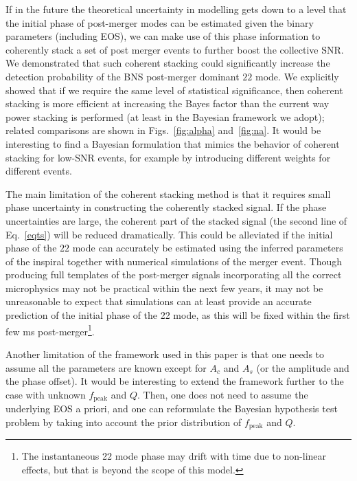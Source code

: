 \documentclass[prd,aps,floatfix,superscriptaddress,nofootinbib,twocolumn,10pt,English]{revtex4-1}
\begin{document}
If in the future the theoretical uncertainty in modelling gets down 
to a level that the initial phase of post-merger modes can be estimated
given the binary parameters (including EOS), we can make
use of this phase information to
coherently stack a set of post merger events to further boost the collective
SNR. We demonstrated that such coherent stacking could significantly
increase the detection probability of the BNS post-merger dominant
$22$ mode. 
We explicitly
showed that if we require the same level of statistical significance,
then coherent stacking is more efficient at increasing the Bayes
factor than the current way power stacking is performed (at least in
the Bayesian framework we adopt); related comparisons are shown in
Figs.~\ref{fig:alpha} and~\ref{fig:na}. It would be interesting to
find a Bayesian formulation that mimics the behavior of coherent
stacking for low-SNR events, for example by introducing different
weights for different events.


The main limitation of the coherent stacking method is that it
requires small phase uncertainty in constructing the coherently
stacked signal. If the phase uncertainties are large, the coherent part 
of the stacked signal (the second line of Eq.~\eqref{eqts}) will be reduced dramatically. 
This could be alleviated if the initial phase of the $22$
mode can accurately be estimated using the inferred parameters of the inspiral
together with numerical simulations of the merger event. 
Though producing full templates of the post-merger signals incorporating all
the correct microphysics may not be practical within the next few
years, it may not be unreasonable to expect that simulations can at
least provide an accurate prediction of the initial phase of the 22
mode, as this will be fixed within the first few ms
post-merger\footnote{The instantaneous 22 mode phase may drift with
  time due to non-linear effects, but that is beyond the scope of this
  model.}.


Another limitation of the framework used in this paper is that
one needs to assume all the parameters are known except for 
$A_c$ and $A_s$ (or the amplitude and the phase offset). It would 
be interesting to extend the framework further to the case with unknown
$f_\mathrm{peak}$ and $Q$. Then, one does not need to assume 
the underlying EOS a priori, and one can reformulate the Bayesian
hypothesis test problem by taking into account the prior distribution
of $f_\mathrm{peak}$ and $Q$.
\end{document}
